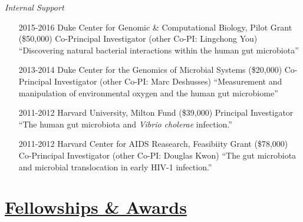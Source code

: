 \documentclass[overlapped,line,11pt]{res}
\begin{document}
\begin{resume}
\emph{Internal Support}
\vspace{.1in}

\begin{itemize}[leftmargin=2cm, style=sameline]

\item[2015-2016] Duke Center for Genomic \& Computational Biology, Pilot Grant
  (\$50,000) \newline Co-Principal Investigator (other Co-PI:
  Lingchong You) \newline ``Discovering natural bacterial interactions
  within the human gut microbiota''

\item[2013-2014] Duke Center for the Genomics of Microbial Systems
  (\$20,000) \newline Co-Principal Investigator (other Co-PI:
  Marc Deshusses) \newline ``Measurement and manipulation of
environmental oxygen and the human gut microbiome''

\item[2011-2012] Harvard University, Milton Fund (\$39,000) \newline
  Principal Investigator \newline ``The human gut microbiota
  and \emph{Vibrio cholerae} infection.''

\item[2011-2012] Harvard Center for AIDS Reasearch, Feasibiity Grant (\$78,000) \newline
  Co-Principal Investigator (other Co-PI: Douglas Kwon) \newline ``The gut microbiota and microbial
translocation in early HIV-1 infection.''

\end{itemize}

\section{\underline{\sc Fellowships \& Awards}} 
\vspace{.25in}


\end{resume}
\end{document}

